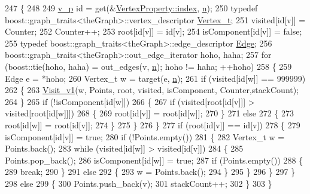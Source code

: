 \begin{DoxyCode}
247 \{
248 
249     \hyperlink{utilities_8h_a3f4959b3d837fa6351a9414c79280286}{v\_p} \textcolor{keywordtype}{id} = \textcolor{keyword}{get}(&\hyperlink{struct_utility_structs_1_1_vertex_property_a636cb729438e999aa3d9a17ac39d8641}{VertexProperty::index}, \hyperlink{class_nuutila_a1409929fa0f38709497f8bdb012af71c}{n});
250     \textcolor{keyword}{typedef} boost::graph\_traits<theGraph>::vertex\_descriptor \hyperlink{class_graph_component_ae67114a6ce5a001dc35e1996e1b45aa0}{Vertex\_t};
251     visited[\textcolor{keywordtype}{id}[v]] = Counter;
252     Counter++;
253     root[\textcolor{keywordtype}{id}[v]] = \textcolor{keywordtype}{id}[v];
254     isComponent[\textcolor{keywordtype}{id}[v]] = \textcolor{keyword}{false};
255     \textcolor{keyword}{typedef} boost::graph\_traits<theGraph>::edge\_descriptor \hyperlink{class_graph_component_aa7517b2af08aa717324076a645c73fe6}{Edge};
256     boost::graph\_traits<theGraph>::out\_edge\_iterator hoho, haha;
257     \textcolor{keywordflow}{for} (boost::tie(hoho, haha) = out\_edges(v, \hyperlink{class_nuutila_a1409929fa0f38709497f8bdb012af71c}{n}); hoho != haha; ++hoho)
258     \{
259         Edge e = *hoho;
260         Vertex\_t w = target(e, \hyperlink{class_nuutila_a1409929fa0f38709497f8bdb012af71c}{n});
261         \textcolor{keywordflow}{if} (visited[\textcolor{keywordtype}{id}[w]] == 999999)
262         \{
263             \hyperlink{class_nuutila_a83b47177cf452e80b3ceaf064ff59840}{Visit\_v1}(w, Points, root, visited, isComponent, Counter,stackCount);
264         \}
265         \textcolor{keywordflow}{if} (!isComponent[\textcolor{keywordtype}{id}[w]])
266         \{
267             \textcolor{keywordflow}{if} (visited[root[\textcolor{keywordtype}{id}[v]]] > visited[root[\textcolor{keywordtype}{id}[w]]])
268             \{
269                 root[\textcolor{keywordtype}{id}[v]] = root[\textcolor{keywordtype}{id}[w]];
270             \}
271             \textcolor{keywordflow}{else}
272             \{
273                 root[\textcolor{keywordtype}{id}[w]] = root[\textcolor{keywordtype}{id}[v]];
274             \}
275         \}
276     \}
277     \textcolor{keywordflow}{if} (root[\textcolor{keywordtype}{id}[v]] == \textcolor{keywordtype}{id}[v])
278     \{
279         isComponent[\textcolor{keywordtype}{id}[v]] = \textcolor{keyword}{true};
280         \textcolor{keywordflow}{if} (!Points.empty())
281         \{
282             Vertex\_t w = Points.back();
283             \textcolor{keywordflow}{while} (visited[\textcolor{keywordtype}{id}[w]] > visited[\textcolor{keywordtype}{id}[v]])
284             \{
285                 Points.pop\_back();
286                 isComponent[\textcolor{keywordtype}{id}[w]] = \textcolor{keyword}{true};
287                 \textcolor{keywordflow}{if} (Points.empty())
288                 \{
289                     \textcolor{keywordflow}{break};
290                 \}
291                 \textcolor{keywordflow}{else}
292                 \{
293                     w = Points.back();
294                 \}
295             \}
296         \}
297     \}
298     \textcolor{keywordflow}{else}
299     \{
300         Points.push\_back(v);
301         stackCount++;
302     \}
303 \}
\end{DoxyCode}
